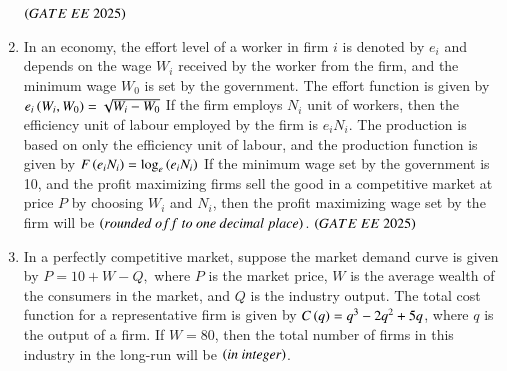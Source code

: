 \documentclass[journal,12pt,onecolumn]{IEEEtran}
\theoremstyle{remark}
\begin{document}
\begin{enumerate}
\begin{center}
\end{center}
 \hfill $\brak{GATE\ EE\ 2025}$
\item In an economy, the effort level of a worker in firm $i$ is denoted by $e_i$ and depends on the wage $W_i$ received by the worker from the firm, and the minimum wage $W_0$ is set by the government. The effort function is given by 
$
e_i\left(W_i, W_0\right) = \sqrt{W_i - W_0}
$
If the firm employs $N_i$ unit of workers, then the efficiency unit of labour employed by the firm is $e_i N_i$. The production is based on only the efficiency unit of labour, and the production function is given by
$
F\left(e_i N_i\right) = \log_e \left(e_i N_i\right)
$
If the minimum wage set by the government is 10, and the profit maximizing firms sell the good in a competitive market at price $P$ by choosing $W_i$ and $N_i$, then the profit maximizing wage set by the firm will be \underline{\hspace{2cm}} $\brak{rounded\ off\ to\ one\ decimal\ place}$. 
 \hfill $\brak{GATE\ EE\ 2025}$
\item In a perfectly competitive market, suppose the market demand curve is given by 
$
P = 10 + W - Q,
$
where $P$ is the market price, $W$ is the average wealth of the consumers in the market, and $Q$ is the industry output. The total cost function for a representative firm is given by $C\left(q\right) = q^3 - 2q^2 + 5q$, where $q$ is the output of a firm. If $W = 80$, then the total number of firms in this industry in the long-run will be \underline{\hspace{2cm}} $\left(in\ integer\right)$.
 

\end{enumerate}
\end{document}
